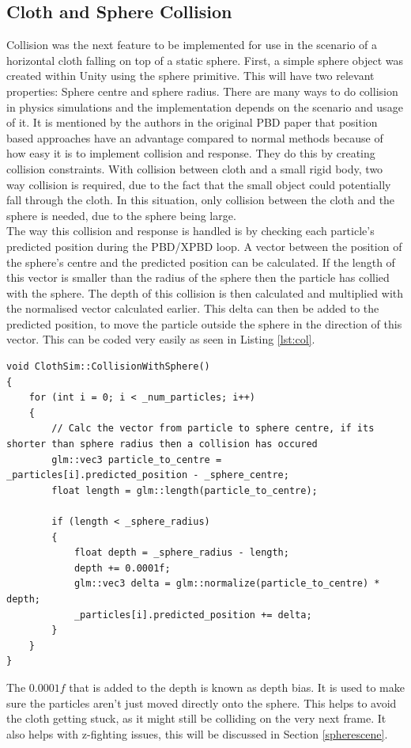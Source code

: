 \documentclass[12pt,a4paper]{article}
\begin{document}
\subsection{Cloth and Sphere Collision}
\label{collision}
Collision was the next feature to be implemented for use in the scenario of a horizontal cloth falling on top of a static sphere. First, a simple sphere object was created within Unity using the sphere primitive. This will have two relevant properties: Sphere centre and sphere radius. There are many ways to do collision in physics simulations and the implementation depends on the scenario and usage of it. It is mentioned by the authors in the original PBD paper that position based approaches have an advantage compared to normal methods because of how easy it is to implement collision and response. They do this by creating collision constraints. With collision between cloth and a small rigid body, two way collision is required, due to the fact that the small object could potentially fall through the cloth. In this situation, only collision between the cloth and the sphere is needed, due to the sphere being large. \\

The way this collision and response is handled is by checking each particle's predicted position during the PBD/XPBD loop. A vector between the position of the sphere's centre and the predicted position can be calculated. If the length of this vector is smaller than the radius of the sphere then the particle has collied with the sphere. The depth of this collision is then calculated and multiplied with the normalised vector calculated earlier. This delta can then be added to the predicted position, to move the particle outside the sphere in the direction of this vector. This can be coded very easily as seen in Listing \ref{lst:col}. 
\begin{lstlisting}[caption={Sphere collision function},label={lst:col}]
void ClothSim::CollisionWithSphere()
{
	for (int i = 0; i < _num_particles; i++)
	{
		// Calc the vector from particle to sphere centre, if its shorter than sphere radius then a collision has occured
		glm::vec3 particle_to_centre = _particles[i].predicted_position - _sphere_centre;
		float length = glm::length(particle_to_centre);
		
		if (length < _sphere_radius)
		{
			float depth = _sphere_radius - length;
			depth += 0.0001f;
			glm::vec3 delta = glm::normalize(particle_to_centre) * depth;
			_particles[i].predicted_position += delta;
		}
	}
}

\end{lstlisting}
The $0.0001f$ that is added to the depth is known as depth bias. It is used to make sure the particles aren't just moved directly onto the sphere. This helps to avoid the cloth getting stuck, as it might still be colliding on the very next frame. It also helps with z-fighting issues, this will be discussed in Section \ref{spherescene}.
\end{document}
